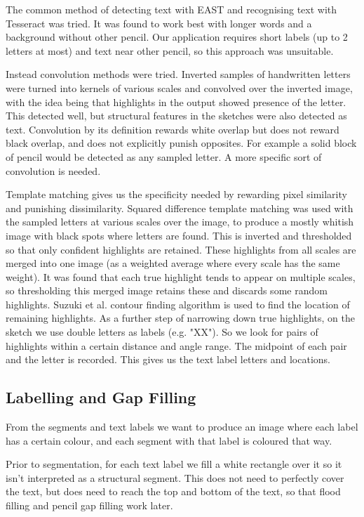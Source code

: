 \documentclass{IEEEtran}
\begin{document}
The common method of detecting text with EAST and recognising text with Tesseract was tried. It was found to work best with longer words and a background without other pencil. Our application requires short labels (up to 2 letters at most) and text near other pencil, so this approach was unsuitable.

Instead convolution methods were tried. Inverted samples of handwritten letters were turned into kernels of various scales and convolved over the inverted image, with the idea being that highlights in the output showed presence of the letter. This detected well, but structural features in the sketches were also detected as text. Convolution by its definition rewards white overlap but does not reward black overlap, and does not explicitly punish opposites. For example a solid block of pencil would be detected as any sampled letter. A more specific sort of convolution is needed.

Template matching gives us the specificity needed by rewarding pixel similarity and punishing dissimilarity. Squared difference template matching was used with the sampled letters at various scales over the image, to produce a mostly whitish image with black spots where letters are found. This is inverted and thresholded so that only confident highlights are retained. These highlights from all scales are merged into one image (as a weighted average where every scale has the same weight). It was found that each true highlight tends to appear on multiple scales, so thresholding this merged image retains these and discards some random highlights. Suzuki et al. \cite{suzuki1985topological} contour finding algorithm is used to find the location of remaining highlights. As a further step of narrowing down true highlights, on the sketch we use double letters as labels (e.g. "XX"). So we look for pairs of highlights within a certain distance and angle range. The midpoint of each pair and the letter is recorded. This gives us the text label letters and locations.

\subsection{Labelling and Gap Filling}

From the segments and text labels we want to produce an image where each label has a certain colour, and each segment with that label is coloured that way.

Prior to segmentation, for each text label we fill a white rectangle over it so it isn't interpreted as a structural segment. This does not need to perfectly cover the text, but does need to reach the top and bottom of the text, so that flood filling and pencil gap filling work later.
\end{document}
